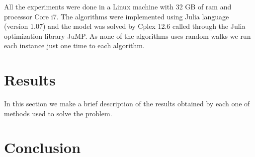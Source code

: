 \documentclass[a4paper,11pt]{article}
\begin{document}
All the experiments were done in a Linux machine with 32 GB of ram and processor Core i7. The algorithms were implemented using Julia language (version 1.07) and the model was solved by Cplex 12.6 called through the Julia optimization library JuMP. As none of the algorithms uses random walks we run each instance just one time to each algorithm. 

\section{Results}

In this section we make a brief description of the results obtained by each one of methods used to solve the problem. 



\section{Conclusion}

~\\


\end{document}
